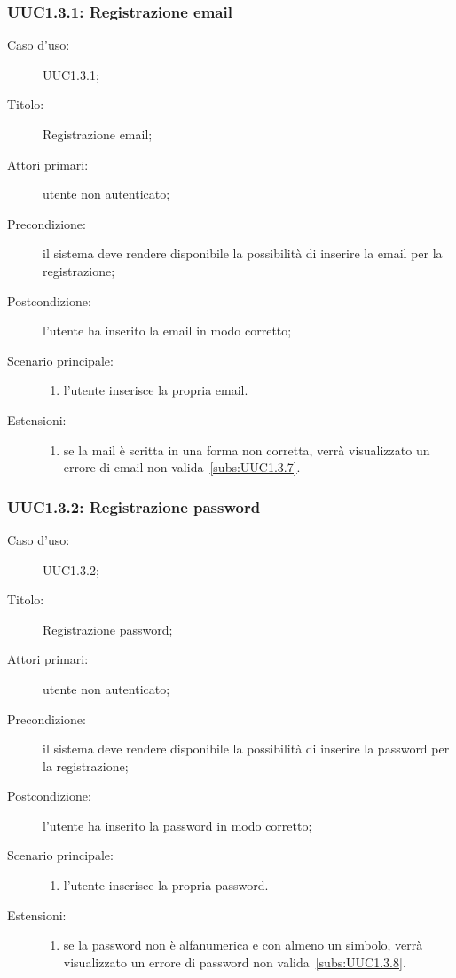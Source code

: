 \documentclass[../../../analisi-dei-requisiti.tex]{subfiles}
\begin{document}
\subsubsection{UUC1.3.1: Registrazione email}%
\label{subs:UUC1.3.1}
\begin{description}
  \item[Caso d'uso:] UUC1.3.1;
  \item[Titolo:] Registrazione email;
  \item[Attori primari:] utente non autenticato;
  \item[Precondizione:] il sistema deve rendere disponibile la possibilità di inserire la email per la registrazione;
  \item[Postcondizione:] l'utente ha inserito la email in modo corretto;
  \item[Scenario principale:]
        \begin{enumerate}
          \item l'utente inserisce la propria email.
        \end{enumerate}
  \item[Estensioni:]
        \begin{enumerate}
          \item se la mail è scritta in una forma non corretta, verrà visualizzato un errore di email non valida~\ref{subs:UUC1.3.7}.
        \end{enumerate}
\end{description}



\subsubsection{UUC1.3.2: Registrazione password}%
\label{subs:UUC1.3.2}
\begin{description}
  \item[Caso d'uso:] UUC1.3.2;
  \item[Titolo:] Registrazione password;
  \item[Attori primari:] utente non autenticato;
  \item[Precondizione:] il sistema deve rendere disponibile la possibilità di inserire la password per la registrazione;
  \item[Postcondizione:] l'utente ha inserito la password in modo corretto;
  \item[Scenario principale:]
        \begin{enumerate}
          \item l'utente inserisce la propria password.
        \end{enumerate}
  \item[Estensioni:]
        \begin{enumerate}
          \item se la password non è alfanumerica e con almeno un simbolo, verrà visualizzato un errore di password non valida~\ref{subs:UUC1.3.8}.
        \end{enumerate}
\end{description}
\end{document}
